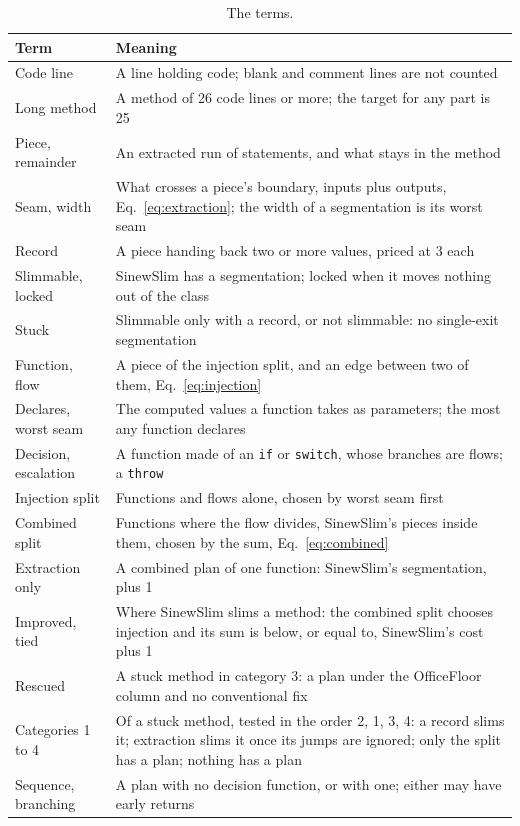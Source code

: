 \documentclass[11pt,a4paper]{article}
\newcommand{\sig}[1]{\texttt{#1}}
\begin{document}
\begin{table}[t]
\centering\small
\caption{The terms.}
\label{tab:glossary}
\begin{tabular}{>{\raggedright\arraybackslash}p{3.3cm}>{\raggedright\arraybackslash}p{11.9cm}}
\toprule
Term & Meaning \\
\midrule
Code line & A line holding code; blank and comment lines are not counted \\
Long method & A method of 26 code lines or more; the target for any part is 25 \\
Piece, remainder & An extracted run of statements, and what stays in the method \\
Seam, width & What crosses a piece's boundary, inputs plus outputs, Eq.~\eqref{eq:extraction}; the width of a segmentation is its worst seam \\
Record & A piece handing back two or more values, priced at 3 each \\
Slimmable, locked & SinewSlim has a segmentation; locked when it moves nothing out of the class \\
Stuck & Slimmable only with a record, or not slimmable: no single-exit segmentation \\
Function, flow & A piece of the injection split, and an edge between two of them, Eq.~\eqref{eq:injection} \\
Declares, worst seam & The computed values a function takes as parameters; the most any function declares \\
Decision, escalation & A function made of an \sig{if} or \sig{switch}, whose branches are flows; a \sig{throw} \\
Injection split & Functions and flows alone, chosen by worst seam first \\
Combined split & Functions where the flow divides, SinewSlim's pieces inside them, chosen by the sum, Eq.~\eqref{eq:combined} \\
Extraction only & A combined plan of one function: SinewSlim's segmentation, plus 1 \\
Improved, tied & Where SinewSlim slims a method: the combined split chooses injection and its sum is below, or equal to, SinewSlim's cost plus 1 \\
Rescued & A stuck method in category 3: a plan under the OfficeFloor column and no conventional fix \\
Categories 1 to 4 & Of a stuck method, tested in the order 2, 1, 3, 4: a record slims it; extraction slims it once its jumps are ignored; only the split has a plan; nothing has a plan \\
Sequence, branching & A plan with no decision function, or with one; either may have early returns \\
\bottomrule
\end{tabular}
\end{table}
\end{document}
